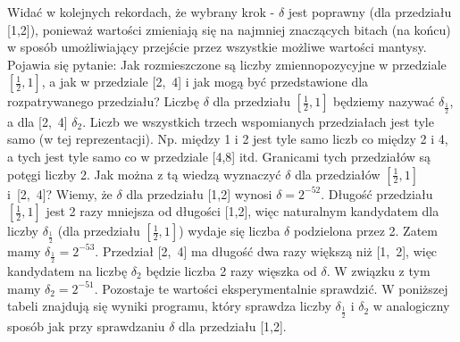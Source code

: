 \documentclass[]{article}
\begin{document}
	Widać w kolejnych rekordach, że wybrany krok - $\delta$ jest poprawny (dla przedziału [1,2]), ponieważ wartości zmieniają się na najmniej znaczących bitach (na końcu) w sposób umożliwiający przejście przez wszystkie możliwe wartości mantysy. \newline 
	Pojawia się pytanie: Jak rozmieszczone są liczby zmiennopozycyjne w przedziale \([\frac{1}{2},1]\), a jak w przedziale \mbox{[2, 4]} i jak
	mogą być przedstawione dla rozpatrywanego przedziału? \newline
	Liczbę $\delta$ dla przedziału \([\frac{1}{2},1]\) będziemy nazywać $\delta_{\frac{1}{2}}$, a dla \mbox{[2, 4]}  $\delta_2$. Liczb we wszystkich trzech wspomianych przedziałach jest tyle samo (w tej reprezentacji). Np. między 1 i 2 jest tyle samo liczb co między 2 i 4, a tych jest tyle samo co w przedziale [4,8] itd. Granicami tych przedziałów są potęgi liczby 2. Jak można z tą wiedzą wyznaczyć $\delta$ dla przedziałów  \([\frac{1}{2},1]\) \mbox{i [2, 4]?} Wiemy, że $\delta$ dla przedziału [1,2] wynosi \(\delta = 2^{-52}\). Długość przedziału \([\frac{1}{2},1]\) jest 2 razy mniejsza od długości [1,2], więc naturalnym kandydatem dla liczby $\delta_{\frac{1}{2}}$ (dla przedziału \([\frac{1}{2},1]\)) wydaje się liczba $\delta$ podzielona przez 2. Zatem mamy \(\delta_{\frac{1}{2}} = 2^{-53}\). \newline 
	Przedział \mbox{[2, 4]} ma długość dwa razy większą niż \mbox{[1, 2]}, więc kandydatem na liczbę $\delta_2$ będzie liczba 2 razy więszka od $\delta$. W związku z tym mamy \(\delta_2 = 2^{-51}\).
	Pozostaje te wartości eksperymentalnie sprawdzić. W poniższej tabeli znajdują się wyniki programu, który sprawdza liczby $\delta_{\frac{1}{2}}$ i $\delta_2$ w analogiczny sposób jak przy sprawdzaniu $\delta$ dla przedziału \mbox{[1,2]}.
	
\end{document}
